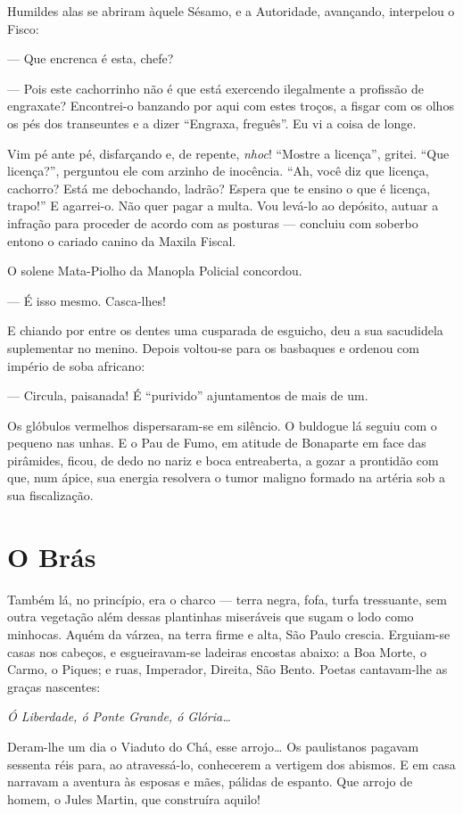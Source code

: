 Humildes alas se abriram àquele Sésamo, e a Autoridade, avançando,
interpelou o Fisco:

--- Que encrenca é esta, chefe?

--- Pois este cachorrinho não é que está exercendo ilegalmente a
profissão de engraxate? Encontrei-o banzando por aqui com estes troços,
a fisgar com os olhos os pés dos transeuntes e a dizer ``Engraxa,
freguês''. Eu vi a coisa de longe.

Vim pé ante pé, disfarçando e, de repente, \emph{nhoc}! ``Mostre a
licença'', gritei. ``Que licença?'', perguntou ele com arzinho de
inocência. ``Ah, você diz que licença, cachorro? Está me debochando,
ladrão? Espera que te ensino o que é licença, trapo!'' E agarrei-o. Não
quer pagar a multa. Vou levá-lo ao depósito, autuar a infração para
proceder de acordo com as posturas --- concluiu com soberbo entono o
cariado canino da Maxila Fiscal.

O solene Mata-Piolho da Manopla Policial concordou.

--- É isso mesmo. Casca-lhes!

E chiando por entre os dentes uma cusparada de esguicho, deu a sua
sacudidela suplementar no menino. Depois voltou-se para os basbaques e
ordenou com império de soba africano:

--- Circula, paisanada! É ``purivido'' ajuntamentos de mais de um.

Os glóbulos vermelhos dispersaram-se em silêncio. O buldogue lá seguiu
com o pequeno nas unhas. E o Pau de Fumo, em atitude de Bonaparte em
face das pirâmides, ficou, de dedo no nariz e boca entreaberta, a gozar
a prontidão com que, num ápice, sua energia resolvera o tumor maligno
formado na artéria sob a sua fiscalização.

\section{O Brás}

Também lá, no princípio, era o charco --- terra negra, fofa, turfa
tressuante, sem outra vegetação além dessas plantinhas miseráveis que
sugam o lodo como minhocas. Aquém da várzea, na terra firme e alta, São
Paulo crescia. Erguiam-se casas nos cabeços, e esgueiravam-se ladeiras
encostas abaixo: a Boa Morte, o Carmo, o Piques; e ruas, Imperador,
Direita, São Bento. Poetas cantavam-lhe as graças nascentes:

\emph{Ó Liberdade, ó Ponte Grande, ó Glória\ldots{}}

Deram-lhe um dia o Viaduto do Chá, esse arrojo\ldots{} Os paulistanos pagavam
sessenta réis para, ao atravessá-lo, conhecerem a vertigem dos abismos.
E em casa narravam a aventura às esposas e mães, pálidas de espanto. Que
arrojo de homem, o Jules Martin, que construíra aquilo!

